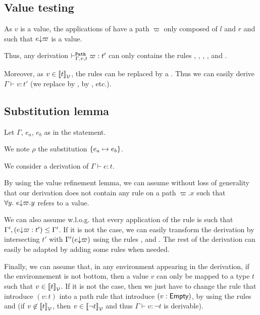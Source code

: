 \documentclass[a4paper]{article}
\theoremstyle{definition}
\begin{document}
        \subsection{Value testing}

        As $v$ is a value, the applications of  have a path $\varpi$ only composed of $l$ and $r$
        and such that $e{\downarrow}\varpi$ is a value.

        Thus, any derivation $\vdash^{\texttt{Path}}_{\Gamma,v,t} \varpi:t'$ can only contains the rules
        , , , ,  and .

        Moreover, as $v \in {\llbracket t \rrbracket}_{\mathcal{V}}$, the rules  can be replaced by a .
        Thus we can easily derive $\Gamma \vdash v:t'$ (we replace  by ,
         by , etc.).

        \subsection{Substitution lemma}

        Let $\Gamma$, $e_a$, $e_b$ as in the statement.

        We note $\rho$ the substitution $\{e_a \mapsto e_b\}$.

        We consider a derivation of $\Gamma \vdash e:t$.

        By using the value refinement lemma, we can assume without loss of generality that our derivation does not contain
        any rule  on a path $\varpi.x$ such that $\forall y.\ e{\downarrow}\varpi.y$ refers to a value.

        We can also assume w.l.o.g. that every application of the  rule is such that $\Gamma',(e{\downarrow}\varpi:t') \leq \Gamma'$. If it is not the case,
        we can easily transform the derivation by intersecting $t'$ with $\Gamma'(e{\downarrow}\varpi)$
        using the rules ,  and .
        The rest of the derivation can easily be adapted by adding some  rules when needed.

        Finally, we can assume that, in any environment appearing in the derivation, if the environnement is not bottom,
        then a value $v$ can only be mapped to a type $t$ such that $v\in{\llbracket t \rrbracket}_{\mathcal{V}}$. If it is not the case, then we just have to change the
         rule that introduce $(v:t)$ into a path rule that introduce $(v:\textsf{Empty})$,
        by using the rules  and  (if $v\not\in{\llbracket t \rrbracket}_{\mathcal{V}}$, then $v\in{\llbracket \neg t \rrbracket}_{\mathcal{V}}$
        and thus $\Gamma \vdash v:\neg t$ is derivable).
\end{document}
